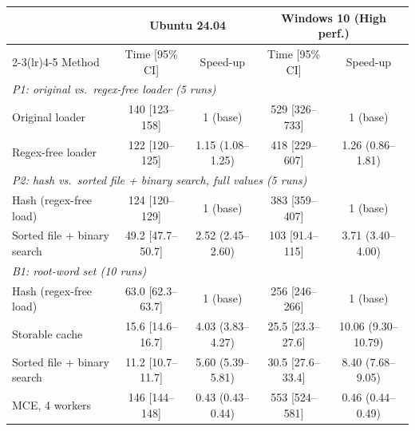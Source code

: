\begin{tabular}{@{}lcccc@{}}
\toprule
 & \multicolumn{2}{c}{Ubuntu 24.04} & \multicolumn{2}{c}{Windows 10 (High perf.)} \\
\cmidrule(lr){2-3}\cmidrule(lr){4-5}
Method & Time [95\% CI] & Speed-up & Time [95\% CI] & Speed-up \\
\midrule
\multicolumn{5}{l}{\textit{P1: original vs.\ regex-free loader (5 runs)}} \\
\quad Original loader & 140 [123--158] & 1 (base) & 529 [326--733] & 1 (base) \\
\quad Regex-free loader & 122 [120--125] & 1.15 (1.08--1.25) & 418 [229--607] & 1.26 (0.86--1.81) \\
\midrule
\multicolumn{5}{l}{\textit{P2: hash vs.\ sorted file + binary search, full values (5 runs)}} \\
\quad Hash (regex-free load) & 124 [120--129] & 1 (base) & 383 [359--407] & 1 (base) \\
\quad Sorted file + binary search & 49.2 [47.7--50.7] & 2.52 (2.45--2.60) & 103 [91.4--115] & 3.71 (3.40--4.00) \\
\midrule
\multicolumn{5}{l}{\textit{B1: root-word set (10 runs)}} \\
\quad Hash (regex-free load) & 63.0 [62.3--63.7] & 1 (base) & 256 [246--266] & 1 (base) \\
\quad Storable cache & 15.6 [14.6--16.7] & 4.03 (3.83--4.27) & 25.5 [23.3--27.6] & 10.06 (9.30--10.79) \\
\quad Sorted file + binary search & 11.2 [10.7--11.7] & 5.60 (5.39--5.81) & 30.5 [27.6--33.4] & 8.40 (7.68--9.05) \\
\quad MCE, 4 workers & 146 [144--148] & 0.43 (0.43--0.44) & 553 [524--581] & 0.46 (0.44--0.49) \\
\bottomrule
\end{tabular}
